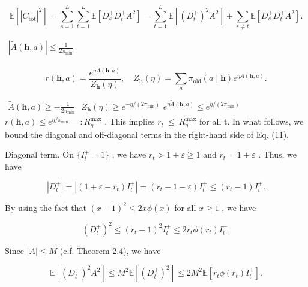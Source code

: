 \documentclass[
  10
]{article}
\begin{document}
\[
\mathbb {E} [ | C _ {\mathrm{tot}} ^ {+} | ^ {2} ] = \sum_ {s = 1} ^ {L} \sum_ {t = 1} ^ {L} \mathbb {E} [ D _ {s} ^ {+} D _ {t} ^ {+} A ^ {2} ] = \sum_ {t = 1} ^ {L} \mathbb {E} [ (D _ {t} ^ {+}) ^ {2} A ^ {2} ] + \sum_ {s \neq t} \mathbb {E} [ D _ {s} ^ {+} D _ {t} ^ {+} A ^ {2} ]. \tag {11}
\]

\(\begin{array} { r } { | \tilde { A } ( \mathbf { h } , a ) | \leq \frac { 1 } { 2 \pi _ { \operatorname* { m i n } } } } \end{array}\)

\[
r (\mathbf {h}, a) = \frac {e ^ {\eta \tilde {A} (\mathbf {h} , a)}}{Z _ {\mathbf {h}} (\eta)}, \quad Z _ {\mathbf {h}} (\eta) = \sum_ {a} \pi_ {\mathrm{old}} (a \mid \mathbf {h}) e ^ {\eta \tilde {A} (\mathbf {h}, a)}.
\]

\(\begin{array} { r } { \tilde { A } ( \mathbf { h } , a ) \geq - \frac { 1 } { 2 \pi _ { \operatorname* { m i n } } } } \end{array}\)
\(Z _ { \mathbf { h } } ( \eta ) \ge e ^ { - \eta / ( 2 \pi _ { \operatorname* { m i n } } ) }\)
\(e ^ { \eta \tilde { A } ( \mathbf { h } , a ) } \leq e ^ { \eta / ( 2 \pi _ { \operatorname* { m i n } } ) }\)
\(r ( \mathbf { h } , a ) \leq e ^ { \eta / \pi _ { \operatorname* { m i n } } } = : R _ { \eta } ^ { \operatorname* { m a x } }\)
. This implies
\(r _ { t } \ \leq \ R _ { \eta } ^ { \mathrm { m a x } }\) for all t.
In what follows, we bound the diagonal and off-diagonal terms in the
right-hand side of Eq. (11).

Diagonal term. On \(\{ I _ { t } ^ { + } = 1 \}\) , we have
\(r _ { t } > 1 + \varepsilon \ge 1\) and
\(\bar { r } _ { t } = 1 + \varepsilon\) . Thus, we have

\[
| D _ {t} ^ {+} | = | (1 + \varepsilon - r _ {t}) I _ {t} ^ {+} | = (r _ {t} - 1 - \varepsilon) I _ {t} ^ {+} \leq (r _ {t} - 1) I _ {t} ^ {+}.
\]

By using the fact that \(( x - 1 ) ^ { 2 } \leq 2 x \phi ( x )\) for all
\(x \geq 1\) , we have

\[
(D _ {t} ^ {+}) ^ {2} \leq (r _ {t} - 1) ^ {2} I _ {t} ^ {+} \leq 2 r _ {t} \phi (r _ {t}) I _ {t} ^ {+}.
\]

Since \(| A | \leq M\) (c.f. Theorem 2.4), we have

\[
\mathbb {E} [ (D _ {t} ^ {+}) ^ {2} A ^ {2} ] \leq M ^ {2} \mathbb {E} [ (D _ {t} ^ {+}) ^ {2} ] \leq 2 M ^ {2} \mathbb {E} [ r _ {t} \phi (r _ {t}) I _ {t} ^ {+} ].
\]
\end{document}

